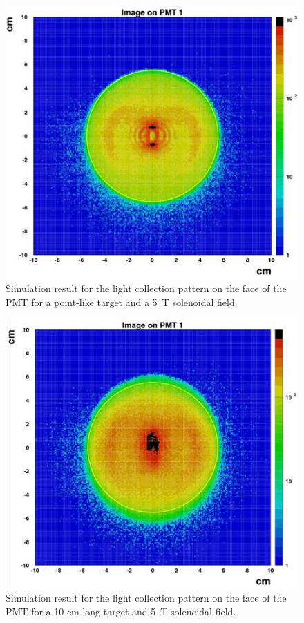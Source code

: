 \begin{figure}[!ht]
    \centering
    \includegraphics[width=1.0\linewidth,trim={0.0cm 0.0cm 0.0cm 0.0cm},clip]{images/Point_Targ_5T_Field_PMT.jpg}
    \caption{Simulation result for the light collection pattern on the face of the PMT for a point-like target and a 5~T
      solenoidal field.}
    \label{fig:Point_Targ_5T_Field_PMT}
\end{figure}

\begin{figure}[!ht]
    \centering
    \includegraphics[width=1.0\linewidth,trim={0.0cm 0.0cm 0.0cm 0.0cm},clip]{images/10cm_Targ_5T_Field_PMT.jpg}
    \caption{Simulation result for the light collection pattern on the face of the PMT for a 10-cm long target and 5~T
      solenoidal field.}
    \label{fig:10cm_Targ_5T_Field_PMT}
\end{figure}

